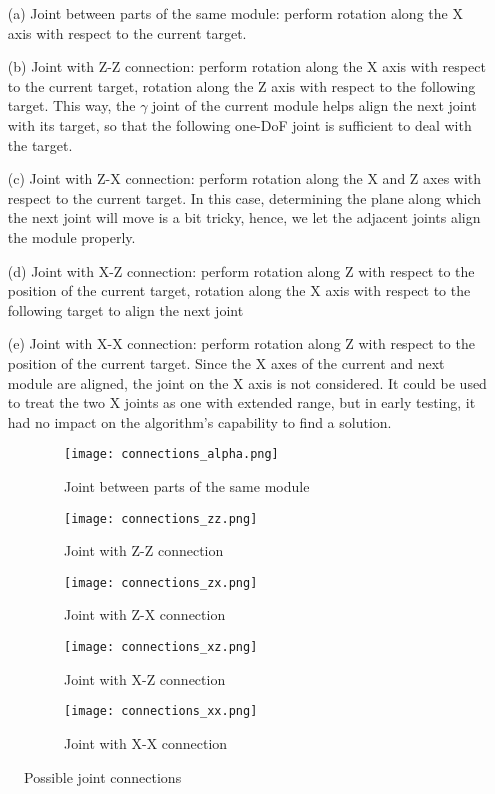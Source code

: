 \begin{itemize}
\item [(a)] Joint between parts of the same module: perform rotation along the X axis with respect to the current target.
\item [(b)] Joint with Z-Z connection: perform rotation along the X axis with respect to the current target, rotation along the Z axis with respect to the following target. This way, the $\gamma$ joint of the current module helps align the next joint with its target, so that the following one-DoF joint is sufficient to deal with the target.
\item [(c)] Joint with Z-X connection: perform rotation along the X and Z axes with respect to the current target. In this case, determining the plane along which the next joint will move is a bit tricky, hence, we let the adjacent joints align the module properly.
\item [(d)] Joint with X-Z connection: perform rotation along Z with respect to the position of the current target, rotation along the X axis with respect to the following target to align the next joint
\item [(e)] Joint with X-X connection: perform rotation along Z with respect to the position of the current target. Since the X axes of the current and next module are aligned, the joint on the X axis is not considered. It could be used to treat the two X joints as one with extended range, but in early testing, it had no impact on the algorithm's capability to find a solution.

\end{itemize}

\begin{figure}[ht]
  \centering
  \begin{subfigure}{0.3\textwidth}
    \centering
    \texttt{[image: connections\_alpha.png]}
    \caption{Joint between parts of the same module}
  \end{subfigure}
  \begin{subfigure}{0.3\textwidth}
    \centering
    \texttt{[image: connections\_zz.png]}
    \caption{Joint with Z-Z connection}
  \end{subfigure}
  \begin{subfigure}{0.3\textwidth}
    \centering
    \texttt{[image: connections\_zx.png]}
    \caption{Joint with Z-X connection}
  \end{subfigure}

  \begin{subfigure}{0.3\textwidth}
    \centering
    \texttt{[image: connections\_xz.png]}
    \caption{Joint with X-Z connection}
  \end{subfigure}
  \begin{subfigure}{0.3\textwidth}
    \centering
    \texttt{[image: connections\_xx.png]}
    \caption{Joint with X-X connection}
  \end{subfigure}
  \caption{Possible joint connections}\label{fig:connections}
\end{figure}


